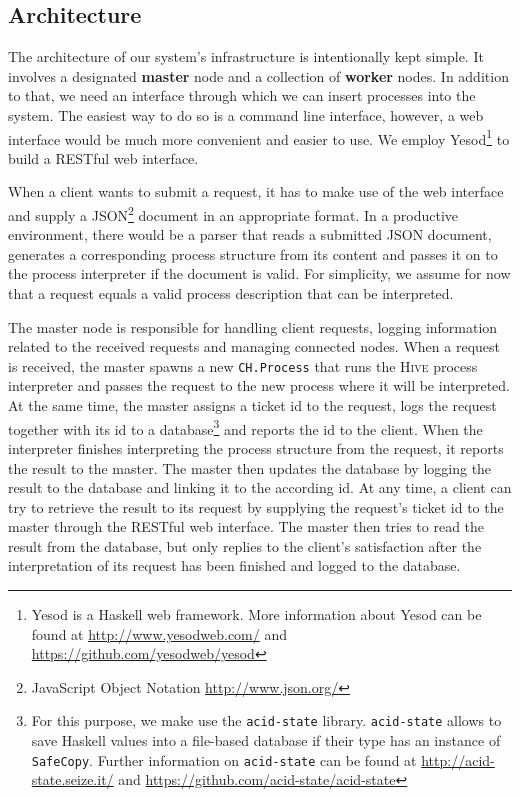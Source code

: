 \subsection{Architecture}
The architecture of our system's infrastructure is intentionally kept simple. It involves a designated \textbf{master} node and a collection of \textbf{worker} nodes. In addition to that, we need an interface through which we can insert processes into the system. The easiest way to do so is a command line interface, however, a web interface would be much more convenient and easier to use. We employ Yesod\footnote{Yesod is a Haskell web framework. More information about Yesod can be found at \url{http://www.yesodweb.com/} and \url{https://github.com/yesodweb/yesod}} to build a RESTful web interface.

When a client wants to submit a request, it has to make use of the web interface and supply a JSON\footnote{JavaScript Object Notation \url{http://www.json.org/}} document in an appropriate format. In a productive environment, there would be a parser that reads a submitted JSON document, generates a corresponding process structure from its content and passes it on to the process interpreter if the document is valid. For simplicity, we assume for now that a request equals a valid process description that can be interpreted.

The master node is responsible for handling client requests, logging information related to the received requests and managing connected nodes. When a request is received, the master spawns a new \texttt{CH.Process} that runs the \textsc{Hive} process interpreter and passes the request to the new process where it will be interpreted. At the same time, the master assigns a ticket id to the request, logs the request together with its id to a database\footnote{For this purpose, we make use the \texttt{acid-state} library. \texttt{acid-state} allows to save Haskell values into a file-based database if their type has an instance of \texttt{SafeCopy}. Further information on \texttt{acid-state} can be found at \url{http://acid-state.seize.it/} and \url{https://github.com/acid-state/acid-state}} and reports the id to the client. When the interpreter finishes interpreting the process structure from the request, it reports the result to the master. The master then updates the database by logging the result to the database and linking it to the according id. At any time, a client can try to retrieve the result to its request by supplying the request's ticket id to the master through the RESTful web interface. The master then tries to read the result from the database, but only replies to the client's satisfaction after the interpretation of its request has been finished and logged to the database.

